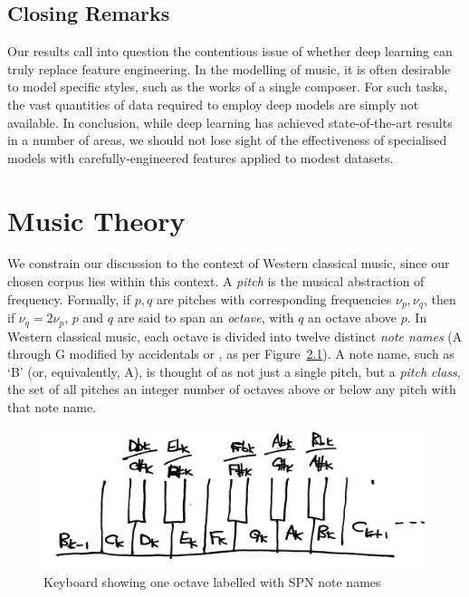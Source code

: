 \documentclass[12pt,a4paper,twoside,openright]{report}
\newcommand{\insharp}[0]{\sharp[raise=0.1,scale=0.8]}
\newcommand{\inflat}[0]{\flat[raise=0.1,scale=0.8]}
\begin{document}
\section{Closing Remarks}

Our results call into question the contentious issue of whether deep learning
can truly replace feature engineering. In the modelling of music, it is often
desirable to model specific styles, such as the works of a single composer. For
such tasks, the vast quantities of data required to employ deep models are
simply not available. In conclusion, while deep learning has achieved
state-of-the-art results in a number of areas, we should not lose sight of the
effectiveness of specialised models with carefully-engineered features applied
to modest datasets.

\printbibliography
{}

\appendix

\chapter{Music Theory}\label{chap:music-theory}

We constrain our discussion to the context of Western classical music, since our
chosen corpus lies within this context. A \emph{pitch} is the musical
abstraction of frequency.  Formally, if $p,q$ are pitches with corresponding
frequencies $\nu_p,\nu_q$, then if $\nu_q = 2\nu_p$, $p$ and $q$ are said to
span an \emph{octave}, with $q$ an octave above $p$. In Western classical music,
each octave is divided into twelve distinct \emph{note names} (A through G
modified by accidentals \insharp{} or \inflat{}, as per
Figure~\ref{fig:keyboard-spn}). A note name, such as `B\inflat' (or,
equivalently, A\insharp), is thought of as not just a single pitch, but a
\emph{pitch class}, the set of all pitches an integer number of octaves above or
below any pitch with that note name.  

\begin{figure}[H]
\centering
\includegraphics[width=350pt]{figs/piano_spn_tmp.jpg}
\caption{Keyboard showing one octave labelled with SPN note names}
\label{fig:keyboard-spn}
\end{figure}
\end{document}
